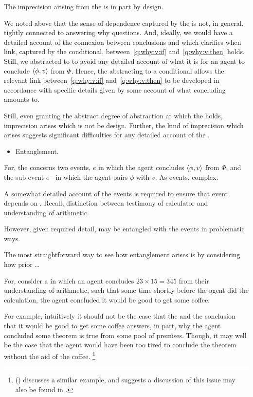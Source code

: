 \begin{note}
  The imprecision arising from the \qWVitc{} is in part by design.

  We noted above that the sense of dependence captured by the \qWVitc{} is not, in general, tightly connected to answering why questions.
  And, ideally, we would have a detailed account of the connexion between conclusions and  which clarifies when link, captured by the conditional, between~\ref{q:why:v:if} and~\ref{q:why:v:then} holds.
  Still, we abstracted to  to avoid any detailed account of what it is for an agent to conclude \(\langle \phi, v \rangle\) from \(\Phi\).
  Hence, the abstracting to a conditional allows the relevant link between~\ref{q:why:v:if} and~\ref{q:why:v:then} to be developed in accordance with specific details given by some account of what concluding amounts to.

  Still, even granting the abstract degree of abstraction at which the \qWVitc{} holds, imprecision arises which is not be design.
  Further, the kind of imprecision which arises suggests significant difficulties for any detailed account of the \qWVitc{}.

  \begin{itemize}
  \item
    Entanglement.
  \end{itemize}

  For, the \qWVitc{} concerns two events, \(e\) in which the agent concludes \(\langle \phi, v \rangle\) from \(\Phi\), and the sub-event \(e^{-}\) in which the agent pairs \(\phi\) with \(v\).
  As events, complex.

  A somewhat detailed account of the events is required to ensure that event depends on \ros{}.
  Recall, distinction between testimony of calculator and understanding of arithmetic.

  However, given required detail,  may be entangled with the events in problematic ways.

  The most straightforward way to see how entanglement arises is by considering how prior  \dots

  For, consider a  in which an agent concludes \(23 \times 15 = 345\) from their understanding of arithmetic, such that some time shortly before the agent did the calculation, the agent concluded it would be good to get some coffee.

  For example, intuitively it should not be the case that the \ros{} and the conclusion that it would be good to get some coffee answers, in part, why the agent concluded some theorem is true from some pool of premises.
  Though, it may well be the case that the agent would have been too tired to conclude the theorem without the aid of the coffee.%
  \footnote{
    \citeauthor{Armstrong:1968vh} (\citeyear[195--196]{Armstrong:1968vh}) discusses a similar example, and suggests a discussion of this issue may also be found in \textcite{Moore:1962up}.
  }


\end{note}
